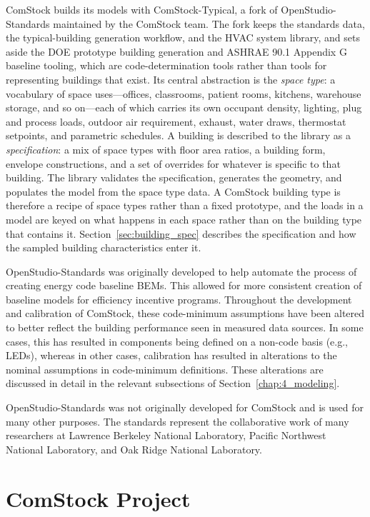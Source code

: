 ComStock builds its models with ComStock-Typical, a fork of OpenStudio-Standards maintained by the ComStock team. The fork keeps the standards data, the typical-building generation workflow, and the HVAC system library, and sets aside the DOE prototype building generation and ASHRAE 90.1 Appendix G baseline tooling, which are code-determination tools rather than tools for representing buildings that exist. Its central abstraction is the \emph{space type}: a vocabulary of space uses---offices, classrooms, patient rooms, kitchens, warehouse storage, and so on---each of which carries its own occupant density, lighting, plug and process loads, outdoor air requirement, exhaust, water draws, thermostat setpoints, and parametric schedules. A building is described to the library as a \emph{specification}: a mix of space types with floor area ratios, a building form, envelope constructions, and a set of overrides for whatever is specific to that building. The library validates the specification, generates the geometry, and populates the model from the space type data. A ComStock building type is therefore a recipe of space types rather than a fixed prototype, and the loads in a model are keyed on what happens in each space rather than on the building type that contains it. Section~\ref{sec:building_spec} describes the specification and how the sampled building characteristics enter it.

OpenStudio-Standards was originally developed to help automate the process of creating energy code baseline BEMs. This allowed for more consistent creation of baseline models for efficiency incentive programs. Throughout the development and calibration of ComStock, these code-minimum assumptions have been altered to better reflect the building performance seen in measured data sources. In some cases, this has resulted in components being defined on a non-code basis (e.g., LEDs), whereas in other cases, calibration has resulted in alterations to the nominal assumptions in code-minimum definitions. These alterations are discussed in detail in the relevant subsections of Section~\ref{chap:4_modeling}.

OpenStudio-Standards was not originally developed for ComStock and is used for many other purposes. The standards represent the collaborative work of many researchers at Lawrence Berkeley National Laboratory, Pacific Northwest National Laboratory, and Oak Ridge National Laboratory.

\section{ComStock Project}

